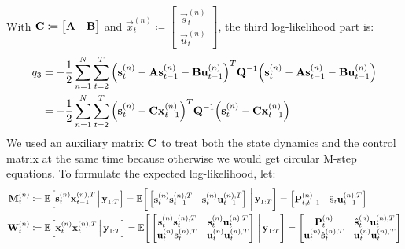 		With \( \mat{C} \coloneqq \begin{bmatrix} \mat{A} & \mat{B} \end{bmatrix} \) and \( \vec{x}_t^{(n)} \coloneqq \begin{bmatrix} \vec{s}_t^{(n)} \\ \vec{u}_t^{(n)} \end{bmatrix} \), the third log-likelihood part is:
		\begin{align*}
			q_3
				&= -\frac{1}{2} \sum_{n = 1}^{N} \sum_{t = 2}^{T} \Big(\vec{s}_t^{(n)} - \mat{A} \vec{s}_{t - 1}^{(n)} - \mat{B} \vec{u}_{t - 1}^{(n)}\Big)^T \mat{Q}^{-1} \Big(\vec{s}_t^{(n)} - \mat{A} \vec{s}_{t - 1}^{(n)} - \mat{B} \vec{u}_{t - 1}^{(n)}\Big) \\
				&= -\frac{1}{2} \sum_{n = 1}^{N} \sum_{t = 2}^{T} \Big(\vec{s}_t^{(n)} - \mat{C} \vec{x}_{t - 1}^{(n)}\Big)^T \mat{Q}^{-1} \Big(\vec{s}_t^{(n)} - \mat{C} \vec{x}_{t - 1}^{(n)}\Big)
		\end{align*}
		We used an auxiliary matrix \( \mat{C} \) to treat both the state dynamics and the control matrix at the same time because otherwise we would get circular M-step equations. To formulate the expected log-likelihood, let:
		\begin{align*}
			\mat{M}_t^{(n)} &\coloneqq \E\Big[ \vec{s}_t^{(n)} \vec{x}_{t - 1}^{(n), T} \Biggiven \vec{y}_{1:T} \Big] = \E\bigg[ \begin{bmatrix} \vec{s}_t^{(n)} \vec{s}_{t - 1}^{(n), T} & \vec{s}_t^{(n)} \vec{u}_{t - 1}^{(n), T} \end{bmatrix} \bigggiven \vec{y}_{1:T} \bigg] = \begin{bmatrix} \mat{P}_{t, t - 1}^{(n)} & \hat{\vec{s}}_t \vec{u}_{t - 1}^{(n), T} \end{bmatrix} \\
			\mat{W}_t^{(n)} &\coloneqq \E\Big[ \vec{x}_t^{(n)} \vec{x}_t^{(n), T} \Biggiven \vec{y}_{1:T} \Big] = \E\Bigg[ \begin{bmatrix} \vec{s}_t^{(n)} \vec{s}_t^{(n), T} & \vec{s}_t^{(n)} \vec{u}_t^{(n), T} \\ \vec{u}_t^{(n)} \vec{s}_t^{(n), T} & \vec{u}_t^{(n)} \vec{u}_t^{(n), T} \end{bmatrix} \Bigggiven \vec{y}_{1:T} \Bigg] = \begin{bmatrix} \mat{P}_t^{(n)} & \hat{\vec{s}}_t^{(n)} \vec{u}_t^{(n), T} \\ \vec{u}_t^{(n)} \hat{\vec{s}}_t^{(n), T} & \vec{u}_t^{(n)} \vec{u}_t^{(n), T} \end{bmatrix}
		\end{align*}
